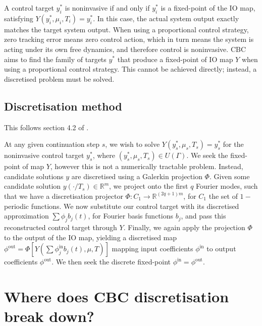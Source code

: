 \documentclass[11pt]{article}
\begin{document}
A control target \(y^*_i\) is noninvasive if and only if \(y_i^*\) is a fixed-point of the IO map, satisfying \(Y(y^*_i, \mu_i, T_i)=y^*_i\).
In this case, the actual system output exactly matches the target system output.
When using a proportional control strategy, zero tracking error means zero control action, which in turn means the system is acting under its own free dynamics, and therefore control is noninvasive.
CBC aims to find the family of targets \(y^*\) that produce a fixed-point of IO map \(Y\) when using a proportional control strategy.
This cannot be achieved directly; instead, a discretised problem must be solved.

\subsection{Discretisation method}
\label{sec:org9c4cb01}

This follows section 4.2 of \cite{sieber2008control}.

At any given continuation step \(s\), we wish to solve \(Y(y^*_s, \mu_s, T_s) = y^*_s\) for the noninvasive control target \(y^*_s\), where \((y^*_s, \mu_s, T_s)\in U(\Gamma)\).
We seek the fixed-point of map \(Y\), however this is not a numerically tractable problem.
Instead, candidate solutions \(y\) are discretised using a Galerkin projection \(\Phi\).
Given some candidate solution \(y(\cdot/T_s)\in\mathbb{R}^m\), we project onto the first \(q\) Fourier modes, such that we have a discretisation projector \(\Phi:C_1 \to \mathbb{R}^{(2q+1)m}\), for \(C_1\) the set of \(1-\)periodic functions.
We now substitute our control target with its discretised approximation \(\sum \phi_j b_j(t)\), for Fourier basis functions \(b_j\), and pass this reconstructed control target through \(Y\).
Finally, we again apply the projection \(\Phi\) to the output of the IO map, yielding a discretised map
\(\phi^{\text{out}} = \Phi\left[Y\left(\sum \phi^\text{in}_j b_j(t), \mu, T\right)\right]\) mapping input coefficients \(\phi^{\text{in}}\) to output coefficients \(\phi^{\text{out}}\).
We then seek the discrete fixed-point \(\phi^{\text{in}} = \phi^{\text{out}}\).

\section{Where does CBC discretisation break down?}
\label{sec:orga7a5fb1}
\end{document}
